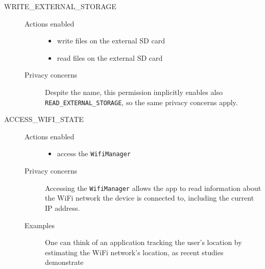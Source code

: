 \documentclass[twoside,letterpaper]{soups}
\theoremstyle{definition}
\begin{document}
\begin{description}
    \item[WRITE\_EXTERNAL\_STORAGE] \hfill
        \begin{description}
             \item[Actions enabled] \hfill
                \begin{itemize}
                    \item write files on the external SD card
                    \item read files on the external SD card
                 \end{itemize} 
             \item[Privacy concerns]
                Despite the name, this permission implicitly enables also \texttt{READ\_EXTERNAL\_STORAGE}, so the same privacy concerns apply.
         \end{description} 

    \item[ACCESS\_WIFI\_STATE] \hfill
        \begin{description}
             \item[Actions enabled] \hfill
                \begin{itemize}
                    \item access the \texttt{WifiManager}
                 \end{itemize} 
             \item[Privacy concerns]
                Accessing the \texttt{WifiManager} allows the app to read information about the WiFi network the device is connected to, including the current IP address.
             \item[Examples]
                One can think of an application tracking the user's location by estimating the WiFi network's location, as recent studies demonstrate \cite{Yang:2008:ELU:1339822.1339967}
         \end{description} 


\end{description}
\end{document}
